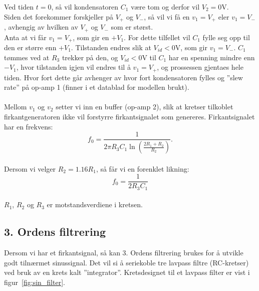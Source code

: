 \documentclass[a4paper,11pt,norsk]{article}
\begin{document}
Ved tiden $t=0$, så vil kondensatoren $C_1$ være tom og derfor vil $V_2 = 0$V. \\
Siden det forekommer forskjeller på $V_+$ og $V_-$, så vil vi få en $v_1 = V_+$ eler $v_1 = V_-$, avhengig av hvilken av $V_+$ og $V_-$ som er størst. \\
Anta at vi får $v_1 = V_+$, som gir en $+V_1$. 
For dette tilfellet vil $C_1$ fylle seg opp til den er større enn $+V_1$. Tilstanden endres slik at $V_{id} < 0$V, som gir $v_1 = V_-$.
$C_1$ tømmes ved at $R_3$ trekker på den, og $V_{id} < 0$V til $C_1$ har en spenning mindre enn $-V_1$, hvor tilstanden igjen vil endres til å $v_1 = V_+$, og prossessen gjentaes hele tiden.
Hvor fort dette går avhenger av hvor fort kondensatoren fylles og ''slew rate'' på op-amp 1 (finner i et datablad for modellen brukt).
\\\\
Mellom $v_1$ og $v_2$ setter vi inn en buffer (op-amp 2), slik at kretser tilkoblet firkantgeneratoren ikke vil forstyrre firkantsignalet som genereres.
\newpage
Firkantsignalet har en frekvens:
\begin{equation}
    f_0 = \frac{1}{2\pi R_3 C_1 \ln \left( \frac{2R_1 + R_2}{R_2} \right)}.
\end{equation}\label{eq:freq_advanced}
\\
Dersom vi velger $R_2 = 1.16 R_1$, så får vi en forenklet likning:
\begin{equation}
    f_0 = \frac{1}{2R_3 C_1}
    \label{eq:freq_simple}
\end{equation}
\\
$R_1$, $R_2$ og $R_3$ er motstandsverdiene i kretsen.
\\
\newpage
\subsection{3. Ordens filtrering}\label{sec:filters}
Dersom vi har et firkantsignal, så kan 3. Ordens filtrering brukes for å utvikle godt tilnærmet sinussignal. Det vil si å seriekoble tre lavpass filtre (RC-kretser) ved bruk av en krets kalt ''integrator''. Kretsdesignet til et lavpass filter er vist i figur~\ref{fig:sin_filter}.
\end{document}
